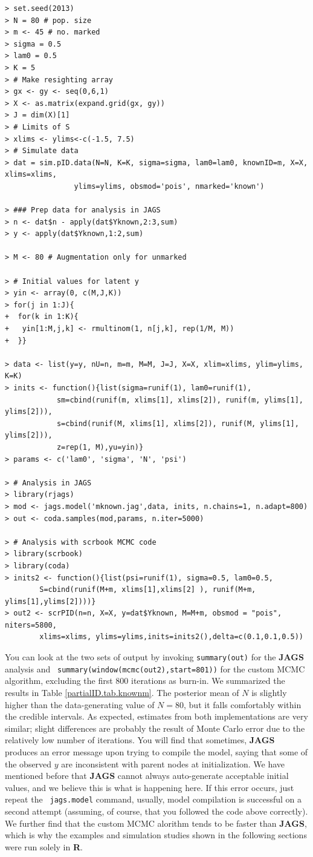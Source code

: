 {\small
\begin{verbatim}
> set.seed(2013)
> N = 80 # pop. size
> m <- 45 # no. marked
> sigma = 0.5
> lam0 = 0.5
> K = 5
> # Make resighting array
> gx <- gy <- seq(0,6,1)
> X <- as.matrix(expand.grid(gx, gy))
> J = dim(X)[1]
> # Limits of S
> xlims <- ylims<-c(-1.5, 7.5)
> # Simulate data
> dat = sim.pID.data(N=N, K=K, sigma=sigma, lam0=lam0, knownID=m, X=X, xlims=xlims,
				ylims=ylims, obsmod='pois',	nmarked='known')

> ### Prep data for analysis in JAGS
> n <- dat$n - apply(dat$Yknown,2:3,sum)
> y <- apply(dat$Yknown,1:2,sum)

> M <- 80 # Augmentation only for unmarked

> # Initial values for latent y
> yin <- array(0, c(M,J,K))
> for(j in 1:J){
+  for(k in 1:K){
+   yin[1:M,j,k] <- rmultinom(1, n[j,k], rep(1/M, M))
+  }}

> data <- list(y=y, nU=n, m=m, M=M, J=J, X=X, xlim=xlims, ylim=ylims, K=K)
> inits <- function(){list(sigma=runif(1), lam0=runif(1),
			sm=cbind(runif(m, xlims[1], xlims[2]), runif(m, ylims[1], ylims[2])),
			s=cbind(runif(M, xlims[1], xlims[2]), runif(M, ylims[1], ylims[2])),
			z=rep(1, M),yu=yin)}
> params <- c('lam0', 'sigma', 'N', 'psi')

> # Analysis in JAGS
> library(rjags)
> mod <- jags.model('mknown.jag',data, inits, n.chains=1, n.adapt=800)
> out <- coda.samples(mod,params, n.iter=5000)

> # Analysis with scrbook MCMC code
> library(scrbook)
> library(coda)
> inits2 <- function(){list(psi=runif(1), sigma=0.5, lam0=0.5,
		S=cbind(runif(M+m, xlims[1],xlims[2] ), runif(M+m, ylims[1],ylims[2])))}
> out2 <- scrPID(n=n, X=X, y=dat$Yknown, M=M+m, obsmod = "pois", niters=5800,
		xlims=xlims, ylims=ylims,inits=inits2(),delta=c(0.1,0.1,0.5))
\end{verbatim}
} 
You can look at the two sets of output by invoking {\tt summary(out)}
for the {\bf JAGS} analysis and {\tt
  summary(window(mcmc(out2),start=801))} for the custom MCMC
algorithm, excluding the first 800 iterations as burn-in.  We
summarized the results in Table \ref{partialID.tab.knownm}.  The
posterior mean of $N$ is slightly higher than the data-generating
value of $N=80$, but it falls comfortably within the credible
intervals.  As expected, estimates from both implementations are very
similar; slight differences are probably the result of Monte Carlo
error due to the relatively
low number of iterations.  You will find that sometimes, {\bf JAGS}
produces an error message upon trying to compile the model, saying
that some of the observed $y$ are inconsistent with parent nodes at
initialization. We have mentioned before that {\bf JAGS} cannot always
auto-generate acceptable initial values, and we believe this is what
is happening here. If this error occurs, just repeat the {\tt
  jags.model} command, usually, model compilation is successful on a
second attempt (assuming, of course, that you followed the code above
correctly). We further find that the custom MCMC alorithm tends to be
faster than {\bf JAGS}, which is why the examples and simulation
studies shown in the following sections were run solely in {\bf R}.

